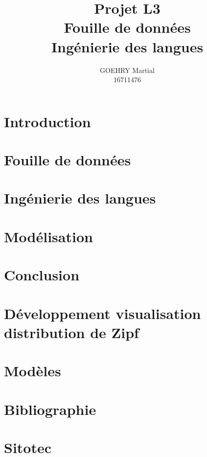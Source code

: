 \documentclass[a4paper,12pt]{article}
\title{Projet L3\\Fouille de données\\Ingénierie des langues}
\author{GOEHRY Martial\\16711476}
\begin{document}
	\maketitle
	\tableofcontents
	\newpage
	
	\section*{Introduction}
		
		\newpage

	\section{Fouille de données}
		\label{sec:fouille-de-donnees}
		
		\newpage
	
	\section{Ingénierie des langues}
		\label{sec:ingenierie-des-langues}
		
		\newpage

	\section{Modélisation}
		\label{sec:modelisation}
		
		\newpage

	\section*{Conclusion}
	
	
	\appendix
	\section{Développement visualisation distribution de Zipf}
		\label{sec:devZipf}
		
	\newpage

	\section{Modèles}
		\label{sec:modeles}
		
	\newpage

	\section{Bibliographie}
		\label{sec:bibliographie}
		
		
	\newpage


	\section{Sitotec}
\end{document}
